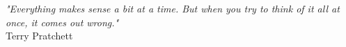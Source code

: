 \thispagestyle{empty}%
\newpage
\null\vfill
\begin{flushright}
\emph{"Everything makes sense a bit at a time. But when you try to think of it all at once, it comes out wrong."}\\
Terry Pratchett
\end{flushright}
   \vspace{3.0cm}
